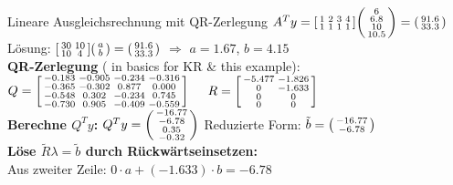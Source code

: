 \begin{example2}{Lineare Ausgleichsrechnung mit QR-Zerlegung}
$A^T y = \begin{bsmallmatrix} 1 & 2 & 3 & 4 \\ 1 & 1 & 1 & 1 \end{bsmallmatrix} \begin{psmallmatrix} 6 \\ 6.8 \\ 10 \\ 10.5 \end{psmallmatrix} = \begin{psmallmatrix} 91.6 \\ 33.3 \end{psmallmatrix}$
\vspace{1mm}\\
Lösung: $\begin{bsmallmatrix} 30 & 10 \\ 10 & 4 \end{bsmallmatrix} \begin{psmallmatrix} a \\ b \end{psmallmatrix} = \begin{psmallmatrix} 91.6 \\ 33.3 \end{psmallmatrix}$ $\Rightarrow$ $a = 1.67$, $b = 4.15$
\vspace{2mm}\\
\textbf{QR-Zerlegung} ( in basics for KR \& this example):
\vspace{1mm}\\
$Q = \begin{bsmallmatrix} -0.183 & -0.905 & -0.234 & -0.316 \\ -0.365 & -0.302 & 0.877 & 0.000 \\ -0.548 & 0.302 & -0.234 & 0.745 \\ -0.730 & 0.905 & -0.409 & -0.559 \end{bsmallmatrix}$
$\quad R = \begin{bsmallmatrix} -5.477 & -1.826 \\ 0 & -1.633 \\ 0 & 0 \\ 0 & 0 \end{bsmallmatrix}$
\vspace{1mm}\\
\textbf{Berechne $Q^T y$:}
$Q^T y = \begin{psmallmatrix} -16.77 \\ -6.78 \\ 0.35 \\ -0.32 \end{psmallmatrix}$
Reduzierte Form: $\tilde{b} = \begin{psmallmatrix} -16.77 \\ -6.78 \end{psmallmatrix}$
\vspace{1mm}\\
\textbf{Löse $\tilde{R} \lambda = \tilde{b}$ durch Rückwärtseinsetzen:}
\vspace{1mm}\\
Aus zweiter Zeile: $0 \cdot a + (-1.633) \cdot b = -6.78$


\end{example2}
